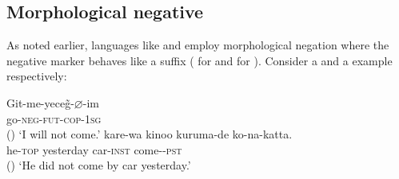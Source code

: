 \documentclass[output=paper
 	        ,biblatex
                ,babelshorthands
                ,newtxmath
                ,draftmode
                ,colorlinks, citecolor=brown
]{langscibook}
\begin{document}
\begin{exe}
\begin{xlist}
\begin{exe}
\begin{xlist}
%




%

\section{Morphological negative}
\label{negation:sec-morphological-negative}

As noted earlier, languages like  and  employ morphological negation
where the negative marker behaves like a suffix (\citealt[]{kelepir} for  and
\citealt{Kato:97,Kato:00} for ). Consider a  and a  example
respectively:

\eal
\ex
\label{negation-turkish-jap}
\gll Git-me-yece\~{g}-$\varnothing$-im \\
     go-\textsc{neg-fut-cop}-\textsc{1sg} \\\hfill()
\glt `I will not come.'
\ex
\gll kare-wa kinoo kuruma-de ko-na-katta. \\
     he-\textsc{top} yesterday car-\textsc{inst} come-\NEG-\textsc{pst} \\\hfill()
\glt `He did not come by car yesterday.'
\zl


\end{xlist}
\end{exe}
\end{xlist}
\end{exe}
\end{document}
